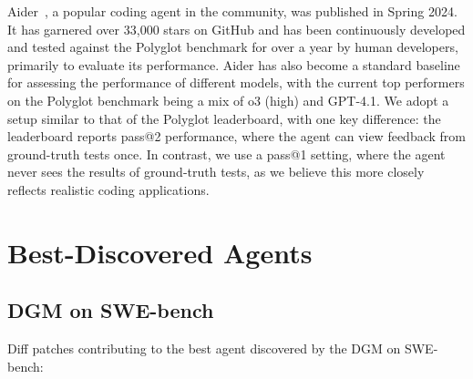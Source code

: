 \documentclass{article} %
\begin{document}
Aider~\citep{aider2024}, a popular coding agent in the community, was published in Spring 2024. It has garnered over 33,000 stars on GitHub and has been continuously developed and tested against the Polyglot benchmark for over a year by human developers, primarily to evaluate its performance. Aider has also become a standard baseline for assessing the performance of different models, with the current top performers on the Polyglot benchmark being a mix of o3 (high) and GPT-4.1. We adopt a setup similar to that of the Polyglot leaderboard, with one key difference: the leaderboard reports pass@2 performance, where the agent can view feedback from ground-truth tests once. In contrast, we use a pass@1 setting, where the agent never sees the results of ground-truth tests, as we believe this more closely reflects realistic coding applications.

\section{Best-Discovered Agents}

\subsection{DGM on SWE-bench}
\label{app:best-agent-dgm}
Diff patches contributing to the best agent discovered by the DGM on SWE-bench:
\end{document}
